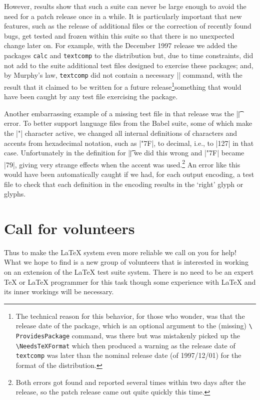 \documentclass{ltugboat}
\begin{document}
However, results show that such a suite can never be large enough to
avoid the need for a patch release once in a while.  It is
particularly important that new
features, such as the release of additional files or the correction of
recently found bugs, get tested and frozen within this suite so that
there is no unexpected change later on.  For example, with the December
1997 release we added the packages \texttt{calc} and \texttt{textcomp}
to the distribution but, due to time constraints, did not add to the suite
additional test files designed to exercise these packages;
and, by Murphy's law, \texttt{textcomp} did not contain a necessary
|\ProvidesPackage| command, with the result that it claimed to be
written for a future release\footnote{The technical reason for this
  behavior, for those who wonder, was that the release date of the
  package, which is an optional argument to the (missing)
  \texttt{\textbackslash
    ProvidesPackage} command, was there but was mistakenly picked up the
  \texttt{\textbackslash NeedsTeXFormat} which then produced a warning
  as the release date of \texttt{textcomp} was later than the nominal
  release date (of 1997/12/01) for the format of the
  distribution.}\Dash something that would have been caught by any test
file exercising the package.

Another embarrassing example of a missing test file in that release
was the |\t| error.  To better support language files from the Babel
suite, some of which make the |"| character active, we changed all
internal definitions of characters and accents from
hexadecimal notation, such as |"7F|, to decimal, i.e., to |127| in that case.
Unfortunately in the definition for |\t| we did this wrong and |"7F|
became |79|, giving very strange effects when the accent was
used.\footnote{Both errors got found and reported several times within
  two days after the release, so the patch release came out quite
  quickly this time.} An error like this would have been automatically
caught if we had, for each output encoding, a test file to
check that each definition in the encoding results in the `right' glyph or
glyphs.


\newpage

\section{Call for volunteers}

Thus to make the \LaTeX{} system even more reliable we call on you for
help! What we hope to find is a new group of volunteers that is
interested in working on an extension of the \LaTeX{} test suite
system. There is no need to be an expert \TeX{} or \LaTeX{} programmer
for this task though some experience with \LaTeX{} and its inner
workings will be necessary.
\end{document}
